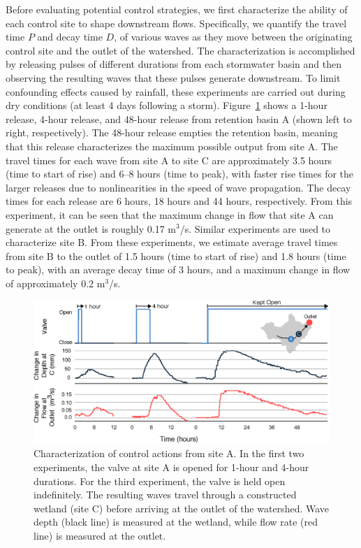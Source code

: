 Before evaluating potential control strategies, we first characterize the ability of each control site to shape downstream flows. Specifically, we quantify the travel time $P$ and decay time $D$, of various waves as they move between the originating control site and the outlet of the watershed. The characterization is accomplished by releasing pulses of different durations 
from each stormwater basin and then observing the resulting waves that these pulses generate downstream. To limit confounding effects caused by rainfall, these experiments are carried out during dry conditions (at least 4 days following a storm). Figure~\ref{fig-ch2:3} shows a 1-hour release, 4-hour release, and 48-hour release from retention basin A (shown left to right, respectively). The 48-hour release empties the retention basin, meaning that this release characterizes the maximum possible output from site A. The travel times for each wave from site A to site C are approximately 3.5 hours (time to start of rise) and 6--8 hours (time to peak), with faster rise times for the larger releases due to nonlinearities in the speed of wave propagation. The decay times for each release are 6 hours, 18 hours and 44 hours, respectively. From this experiment, it can be seen that the maximum change in flow that site A can generate at the outlet is roughly 0.17 m$^3$/s.
Similar experiments are used to characterize site B. From these experiments, we estimate average travel times from site B to the outlet of 1.5 hours (time to start of rise) and 1.8 hours (time to peak), with an average decay time of 3 hours, and a maximum change in flow of approximately 0.2 m$^3$/s.

\begin{figure}[H]
    \centering
    \includegraphics[width=\textwidth]{gfx/Chapter-2/fod.eps}
    \caption{Characterization of
    control actions from site A. In the first two experiments,
    the valve at site A is opened for 1-hour and 4-hour durations. For the third experiment, the valve is held open indefinitely.
    The resulting waves travel through
    a constructed wetland (site C) %
    before arriving at the outlet of the watershed. Wave depth (black line) is measured at the wetland, while flow rate (red line) is measured at the outlet.}\label{fig-ch2:3}
\end{figure}

